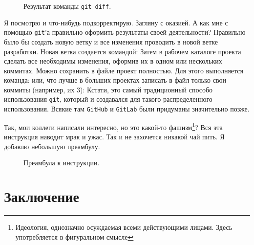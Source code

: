 \documentclass[14pt,a4paper]{article}
\begin{document}
\begin{figure}
	\centering
	\caption{Результат команды \texttt{git diff}.}
	\label{pic-diff-result}
\end{figure}

 Я посмотрю и что-нибудь подкорректирую. Загляну с оказией. 
А как мне с помощью \texttt{git}'а правильно оформить результаты своей деятельности?
 Правильно было бы создать новую ветку и все изменения проводить 
в новой ветке разработки. Новая ветка создается командой:
Затем в рабочем каталоге проекта сделать все необходимы изменения, оформив их в одном
или нескольких коммитах. Можно сохранить в файле проект полностью. Для этого выполняется 
команда:
или, что лучше в больших проектах записать в файл только свои коммиты (например, их 3):
Кстати, это самый традиционный способо использования \texttt{git}, который и создавался
для такого распределенного использования. Всякие там \texttt{GitHub} и \texttt{GitLab}
были придуманы значительно позже.

 Так, мои коллеги написали интересно, но это какой-то
фашизм\footnote{Идеология, однозначно осуждаемая всеми действующими лицами. Здесь употребляется в
фигуральном смысле}? Вся эта инструкция наводит мрак и ужас. Так и не захочется никакой чай пить.
Я добавлю небольшую преамбулу.

\begin{figure}
	\centering
	\caption{Преамбула к инструкции.}
	\label{listing-preambula}
\end{figure}


 
\section{Заключение}
\end{document}
